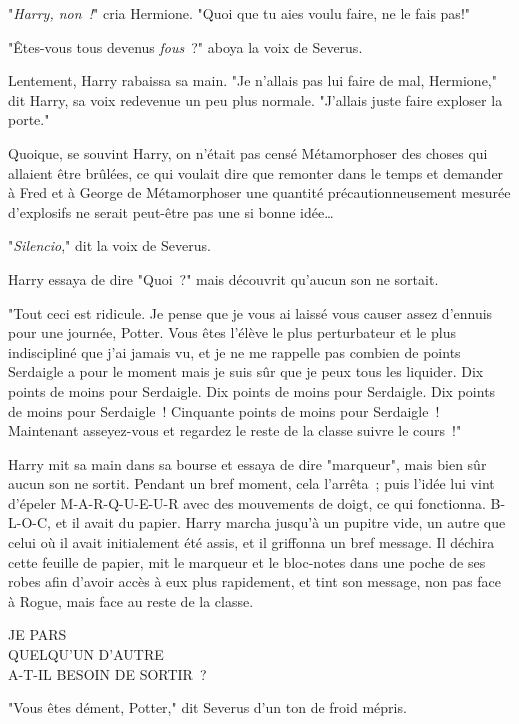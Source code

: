 "\emph{Harry, non~!}" cria Hermione. "Quoi que tu aies voulu faire, ne le fais pas!"

"Êtes-vous tous devenus \emph{fous}~?" aboya la voix de Severus.

Lentement, Harry rabaissa sa main. "Je n'allais pas lui faire de mal, Hermione," dit Harry, sa voix redevenue un peu plus normale. "J'allais juste faire exploser la porte."

Quoique, se souvint Harry, on n'était pas censé Métamorphoser des choses qui allaient être brûlées, ce qui voulait dire que remonter dans le temps et demander à Fred et à George de Métamorphoser une quantité précautionneusement mesurée d'explosifs ne serait peut-être pas une si bonne idée…

"\emph{Silencio}," dit la voix de Severus.

Harry essaya de dire "Quoi~?" mais découvrit qu'aucun son ne sortait.

"Tout ceci est ridicule. Je pense que je vous ai laissé vous causer assez d'ennuis pour une journée, Potter. Vous êtes l'élève le plus perturbateur et le plus indiscipliné que j'ai jamais vu, et je ne me rappelle pas combien de points Serdaigle a pour le moment mais je suis sûr que je peux tous les liquider. Dix points de moins pour Serdaigle. Dix points de moins pour Serdaigle. Dix points de moins pour Serdaigle~! Cinquante points de moins pour Serdaigle~! Maintenant asseyez-vous et regardez le reste de la classe suivre le cours~!"

Harry mit sa main dans sa bourse et essaya de dire "marqueur", mais bien sûr aucun son ne sortit. Pendant un bref moment, cela l'arrêta~; puis l'idée lui vint d'épeler M-A-R-Q-U-E-U-R avec des mouvements de doigt, ce qui fonctionna. B-L-O-C, et il avait du papier. Harry marcha jusqu'à un pupitre vide, un autre que celui où il avait initialement été assis, et il griffonna un bref message. Il déchira cette feuille de papier, mit le marqueur et le bloc-notes dans une poche de ses robes afin d'avoir accès à eux plus rapidement, et tint son message, non pas face à Rogue, mais face au reste de la classe.

\begin{writtenNote}
JE PARS\\
QUELQU'UN D'AUTRE\\
A-T-IL BESOIN DE SORTIR~?
\end{writtenNote}

"Vous êtes dément, Potter," dit Severus d'un ton de froid mépris.

